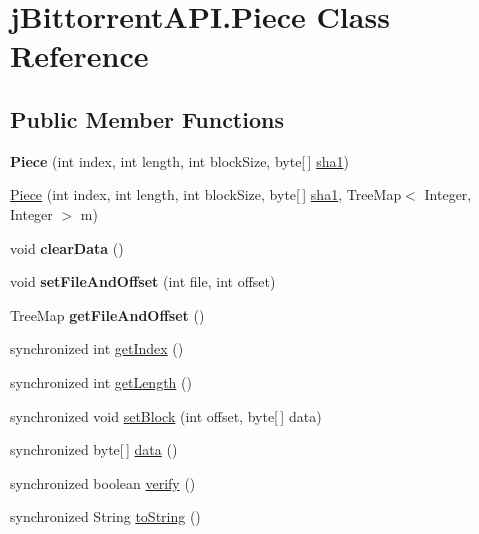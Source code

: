 \hypertarget{classj_bittorrent_a_p_i_1_1_piece}{
\section{jBittorrentAPI.Piece Class Reference}
\label{classj_bittorrent_a_p_i_1_1_piece}
}
\subsection*{Public Member Functions}
\begin{DoxyCompactItemize}
\item 
\hypertarget{classj_bittorrent_a_p_i_1_1_piece_a2da89d5a8d52b6e06dd05f8b3f84d6d6}{
{\bfseries Piece} (int index, int length, int blockSize, byte\mbox{[}$\,$\mbox{]} \hyperlink{classj_bittorrent_a_p_i_1_1_piece_ad13fc2f3c99d51ef782f875d882341cc}{sha1})}
\label{classj_bittorrent_a_p_i_1_1_piece_a2da89d5a8d52b6e06dd05f8b3f84d6d6}

\item 
\hyperlink{classj_bittorrent_a_p_i_1_1_piece_ae94988ffbe6559c92c33020151c5987b}{Piece} (int index, int length, int blockSize, byte\mbox{[}$\,$\mbox{]} \hyperlink{classj_bittorrent_a_p_i_1_1_piece_ad13fc2f3c99d51ef782f875d882341cc}{sha1}, TreeMap$<$ Integer, Integer $>$ m)
\item 
\hypertarget{classj_bittorrent_a_p_i_1_1_piece_a430b8a4e4bbabf7149dd0eedea254aae}{
void {\bfseries clearData} ()}
\label{classj_bittorrent_a_p_i_1_1_piece_a430b8a4e4bbabf7149dd0eedea254aae}

\item 
\hypertarget{classj_bittorrent_a_p_i_1_1_piece_a3b9c62c0d02c2b548f36fc2ecfe80c45}{
void {\bfseries setFileAndOffset} (int file, int offset)}
\label{classj_bittorrent_a_p_i_1_1_piece_a3b9c62c0d02c2b548f36fc2ecfe80c45}

\item 
\hypertarget{classj_bittorrent_a_p_i_1_1_piece_ab97f99a47ffc3ce338ac53306b005032}{
TreeMap {\bfseries getFileAndOffset} ()}
\label{classj_bittorrent_a_p_i_1_1_piece_ab97f99a47ffc3ce338ac53306b005032}

\item 
synchronized int \hyperlink{classj_bittorrent_a_p_i_1_1_piece_ab4afd0119225a5a9b0d11195b388ecf5}{getIndex} ()
\item 
synchronized int \hyperlink{classj_bittorrent_a_p_i_1_1_piece_a2f2bb859545d2369921e08d3b3b417bd}{getLength} ()
\item 
synchronized void \hyperlink{classj_bittorrent_a_p_i_1_1_piece_a57e510992d23328b321f623af02c118b}{setBlock} (int offset, byte\mbox{[}$\,$\mbox{]} data)
\item 
synchronized byte\mbox{[}$\,$\mbox{]} \hyperlink{classj_bittorrent_a_p_i_1_1_piece_af77baf7a92f73795d1e98b85e1ec512d}{data} ()
\item 
synchronized boolean \hyperlink{classj_bittorrent_a_p_i_1_1_piece_a735377bc6777a087f5f456477cd30183}{verify} ()
\item 
synchronized String \hyperlink{classj_bittorrent_a_p_i_1_1_piece_a5f724f5241bc2843435fab2f2a3f7f90}{toString} ()
\end{DoxyCompactItemize}
